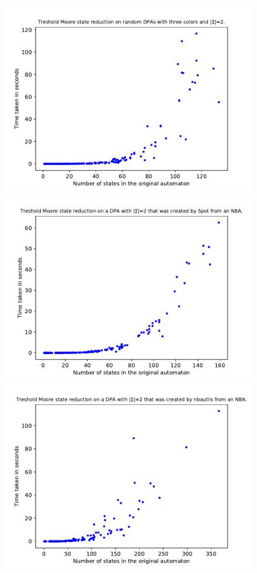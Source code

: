 \begin{figure}
	\centering
	\begin{minipage}{0.49\textwidth}
		\includegraphics[page=6,height=.3\textheight]{../data/analysis/threshold_moore/gendet_ap1.pdf} 
		\includegraphics[page=6,height=.3\textheight]{../data/analysis/threshold_moore/detspot_ap1.pdf} 
		\includegraphics[page=6,height=.3\textheight]{../data/analysis/threshold_moore/detnbaut_ap1.pdf} 

\end{minipage}
\end{figure}
